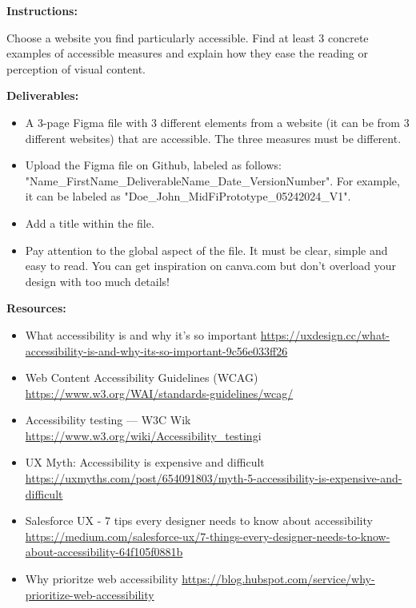 \makeheaderfiles

\textbf{Instructions:}

Choose a website you find particularly accessible. Find at least 3 concrete examples of accessible measures and explain how they ease the reading or perception of visual content.

\textbf{Deliverables:}

\begin{itemize}
\item A 3-page Figma file with 3 different elements from a website (it can be from 3 different websites) that are accessible. The three measures must be different.
\item Upload the Figma file on Github, labeled as follows: "Name\_FirstName\_DeliverableName\_Date\_VersionNumber". For example, it can be labeled as "Doe\_John\_MidFiPrototype\_05242024\_V1".
\item Add a title within the file.
\item Pay attention to the global aspect of the file. It must be clear, simple and easy to read. You can get inspiration on canva.com but don't overload your design with too much details!
\end{itemize}

\textbf{Resources:}

\begin{itemize}
\item What accessibility is and why it's so important \url{https://uxdesign.cc/what-accessibility-is-and-why-its-so-important-9c56e033ff26}
\item Web Content Accessibility Guidelines (WCAG) \url{https://www.w3.org/WAI/standards-guidelines/wcag/}
\item Accessibility testing  ---  W3C Wik \url{https://www.w3.org/wiki/Accessibility_testing}i
\item UX Myth: Accessibility is expensive and difficult \url{https://uxmyths.com/post/654091803/myth-5-accessibility-is-expensive-and-difficult}
\item Salesforce UX - 7 tips every designer needs to know about accessibility \url{https://medium.com/salesforce-ux/7-things-every-designer-needs-to-know-about-accessibility-64f105f0881b}
\item Why prioritze web accessibility \url{https://blog.hubspot.com/service/why-prioritize-web-accessibility}
\end{itemize}

